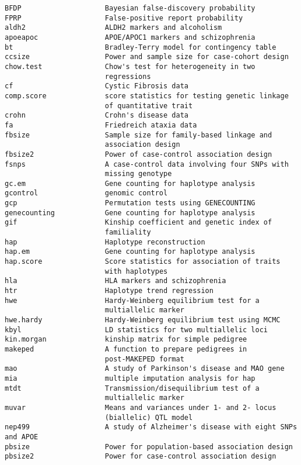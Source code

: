 \documentclass[11pt,a4paper]{article}
\begin{document}
\begin{verbatim}
BFDP                    Bayesian false-discovery probability
FPRP                    False-positive report probability
aldh2                   ALDH2 markers and alcoholism
apoeapoc                APOE/APOC1 markers and schizophrenia
bt                      Bradley-Terry model for contingency table
ccsize                  Power and sample size for case-cohort design
chow.test               Chow's test for heterogeneity in two
                        regressions
cf                      Cystic Fibrosis data
comp.score              score statistics for testing genetic linkage
                        of quantitative trait
crohn                   Crohn's disease data
fa                      Friedreich ataxia data
fbsize                  Sample size for family-based linkage and
                        association design
fbsize2                 Power of case-control association design
fsnps                   A case-control data involving four SNPs with
                        missing genotype
gc.em                   Gene counting for haplotype analysis
gcontrol                genomic control
gcp                     Permutation tests using GENECOUNTING
genecounting            Gene counting for haplotype analysis
gif                     Kinship coefficient and genetic index of
                        familiality
hap                     Haplotype reconstruction
hap.em                  Gene counting for haplotype analysis
hap.score               Score statistics for association of traits
                        with haplotypes
hla                     HLA markers and schizophrenia
htr                     Haplotype trend regression
hwe                     Hardy-Weinberg equilibrium test for a
                        multiallelic marker
hwe.hardy               Hardy-Weinberg equilibrium test using MCMC
kbyl                    LD statistics for two multiallelic loci
kin.morgan              kinship matrix for simple pedigree
makeped                 A function to prepare pedigrees in
                        post-MAKEPED format
mao                     A study of Parkinson's disease and MAO gene
mia                     multiple imputation analysis for hap
mtdt                    Transmission/disequilibrium test of a
                        multiallelic marker
muvar                   Means and variances under 1- and 2- locus
                        (biallelic) QTL model
nep499                  A study of Alzheimer's disease with eight SNPs and APOE
pbsize                  Power for population-based association design
pbsize2                 Power for case-control association design

\end{verbatim}
\end{document}
